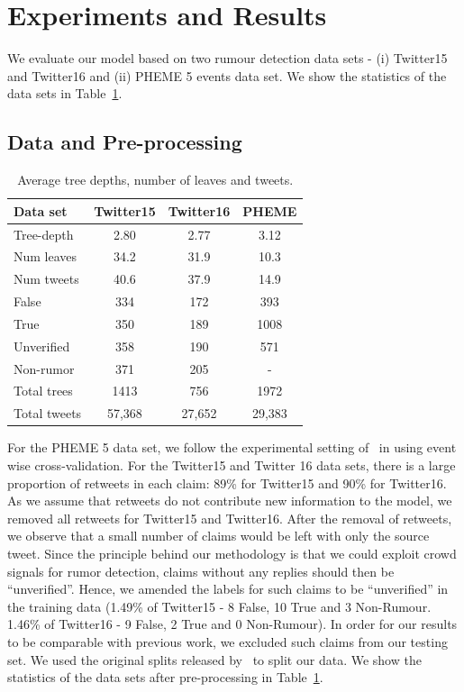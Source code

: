 \documentclass[letterpaper]{article} %
\begin{document}
\section{Experiments and Results}

We evaluate our model based on two rumour detection data sets - (i) Twitter15 and Twitter16 and (ii) PHEME 5 events data set. We show the statistics of the data sets in Table~\ref{tab:data_tree_analysis}.

\subsection{Data and Pre-processing} \label{data_pre_processing}

\begin{table}
\centering
\small
\begin{tabular}{lccc} \toprule
Data set    & Twitter15 & Twitter16 & PHEME \\ \midrule
Tree-depth  & 2.80      & 2.77      & 3.12  \\
Num leaves  & 34.2      & 31.9      & 10.3  \\
Num tweets  & 40.6      & 37.9      & 14.9  \\
False       & 334       & 172       & 393 \\
True        & 350       & 189       & 1008 \\
Unverified  & 358       & 190       & 571 \\
Non-rumor   & 371       & 205       & - \\
Total trees & 1413      & 756       & 1972 \\
Total tweets& 57,368    & 27,652    & 29,383\\
\bottomrule
\end{tabular}
\caption{Average tree depths, number of leaves and tweets.}
\label{tab:data_tree_analysis}
\end{table}

For the PHEME 5 data set, we follow the experimental setting of~\citet{kumar19} in using event wise cross-validation.
For the Twitter15 and Twitter 16 data sets, there is a large proportion of retweets in each claim: 89\% for Twitter15 and 90\% for Twitter16. As we assume that retweets do not contribute new information to the model, we removed all retweets for Twitter15 and Twitter16. After the removal of retweets, we observe that a small number of claims would be left with only the source tweet. Since the principle behind our methodology is that we could exploit crowd signals for rumor detection, claims without any replies should then be ``unverified''. Hence, we amended the labels for such claims to be ``unverified'' in the training data (1.49\% of Twitter15 - 8 False, 10 True and 3 Non-Rumour. 1.46\% of Twitter16 - 9 False, 2 True and 0 Non-Rumour). In order for our results to be comparable with previous work, we excluded such claims from our testing set. We used the original splits released by~\cite{ma18} to split our data.
We show the statistics of the data sets after pre-processing in Table~\ref{tab:data_tree_analysis}.
\end{document}
